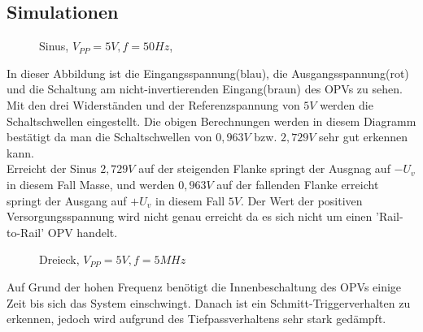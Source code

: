 \subsection{Simulationen}
\begin{figure}[H]
  \centering
  \caption{Sinus, $V_{PP}=5V, f=50Hz$,}
\end{figure}
\noindent
In dieser Abbildung ist die Eingangsspannung(blau), die Ausgangsspannung(rot) und die Schaltung am nicht-invertierenden Eingang(braun) des OPVs zu sehen. Mit den drei Widerst\"anden und der Referenzspannung von $5V$ werden die Schaltschwellen eingestellt. Die obigen Berechnungen werden in diesem Diagramm best\"atigt da man die Schaltschwellen von $0,963V$ bzw. $2,729V$ sehr gut erkennen kann. \\
Erreicht der Sinus $2,729V$ auf der steigenden Flanke springt der Ausgnag auf $-U_v$ in diesem Fall Masse, und werden $0,963V$ auf der fallenden Flanke erreicht springt der Ausgang auf $+U_v$ in diesem Fall $5V$. Der Wert der positiven Versorgungsspannung wird nicht genau erreicht da es sich nicht um einen 'Rail-to-Rail' OPV handelt.

\begin{figure}[H]
  \centering
  \caption{Dreieck, $V_{PP}=5V, f=5MHz$}
\end{figure}
\noindent
Auf Grund der hohen Frequenz ben\"otigt die Innenbeschaltung des OPVs einige Zeit bis sich das System einschwingt. Danach ist ein Schmitt-Triggerverhalten zu erkennen, jedoch wird aufgrund des Tiefpassverhaltens sehr stark ged\"ampft.
